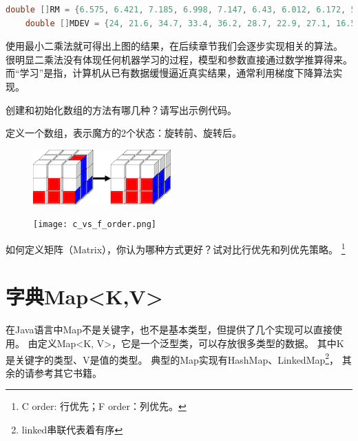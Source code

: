 \begin{example}
	\begin{lstlisting}[language=java]
	double []RM = {6.575, 6.421, 7.185, 6.998, 7.147, 6.43, 6.012, 6.172, 5.631};
	double []MDEV = {24, 21.6, 34.7, 33.4, 36.2, 28.7, 22.9, 27.1, 16.5};
	\end{lstlisting}

	使用最小二乘法就可得出上图的结果，在后续章节我们会逐步实现相关的算法。
	很明显二乘法没有体现任何机器学习的过程，模型和参数直接通过数学推算得来。
	而“学习”是指，计算机从已有数据缓慢逼近真实结果，通常利用梯度下降算法实现。
\end{example}
\bigskip

\begin{exercise}
	创建和初始化数组的方法有哪几种？请写出示例代码。
\end{exercise}

\begin{exercise}
	定义一个数组，表示魔方的2个状态：旋转前、旋转后。
\end{exercise}

\begin{figure}[!htb] \centering
	\begin{minipage}{0.4\textwidth}
		\centerline{\includegraphics[scale=.5]{part1/rubik.png}}
	\end{minipage}
	\begin{minipage}{0.4\textwidth}
		\centerline{\texttt{[image: c\_vs\_f\_order.png]}}
	\end{minipage}
\end{figure}

\begin{exercise}
	如何定义矩阵（Matrix），你认为哪种方式更好？试对比行优先和列优先策略。
	\footnote{C order: 行优先；F order：列优先。}
\end{exercise}

\section{字典Map<K,V>}
	在Java语言中Map不是关键字，也不是基本类型，但提供了几个实现可以直接使用。
	由定义Map<K, V>，它是一个泛型类，可以存放很多类型的数据。
	其中K是关键字的类型、V是值的类型。
	典型的Map实现有HashMap、LinkedMap\footnote{linked串联代表着有序}，
	其余的请参考其它书籍。

